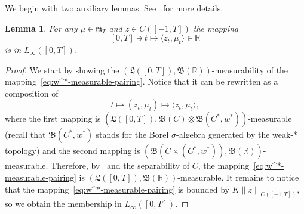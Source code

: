 \documentclass[reqno]{amsart}
\theoremstyle{plain}
\newtheorem{lemma}{Lemma}[section]
\numberwithin{equation}{section}
\numberwithin{definition}{section}
\newcommand\RR{\ensuremath{\mathbb{R}}}
\newcommand{\norm}[1]{\ensuremath{\lVert#1\rVert}}
\newcommand{\WST}{weak\nobreakdash-\hspace{0pt}\textup{*} }
\begin{document}
\smallskip\par 
We begin with two auxiliary lemmas. See~\cite{MK-diss} for more details. 
\begin{lemma}
  For any $\mu\in\mathfrak{m}_T$ and $z\in C([-1,T])$ the mapping 
    \begin{equation}\label{eq:w^*-measurable-pairing}
       [0,T] \ni t\mapsto \langle z_t ,\mu_t \rangle  \in \RR 
    \end{equation}
    is in $L_{\infty}([0,T])$.
\end{lemma}  

\begin{proof} We start by showing the $(\mathfrak{L}([0, T]), \mathfrak{B}(\RR))$\nobreakdash-\hspace{0pt}measurability of the mapping~\eqref{eq:w^*-measurable-pairing}. Notice that it can be rewritten as a composition of 
\begin{equation*}
            t\mapsto (  z_t  , \mu_t ) \mapsto  \langle z_t ,\mu_t \rangle,   
\end{equation*}
where the first mapping is $(\mathfrak{L}([0, T]), \mathfrak{B}(C)\otimes \mathfrak{B}( C^*,w^*) )$\nobreakdash-\hspace{0pt}measurable (recall that $\mathfrak{B}( C^*,w^*)$ stands for the Borel $\sigma$\nobreakdash-\hspace{0pt}algebra generated by the \WST topology) and the second mapping is $(\mathfrak{B}(C \times (C^*,w^*)) ,  \mathfrak{B}(\RR) )$\nobreakdash-\hspace{0pt}measurable. Therefore, by~\cite[Lemma~6.4.2(i)]{V.B.} and the separability of $C$, the mapping~\eqref{eq:w^*-measurable-pairing} is $(\mathfrak{L}([0, T]),\allowbreak \mathfrak{B}(\RR))$-measurable. It remains to notice that the mapping~\eqref{eq:w^*-measurable-pairing} is bounded by $K\norm{z}_{C([-1,T])}$, so we obtain the membership in $L_{\infty}([0,T])$. 
\end{proof} 
\end{document}
